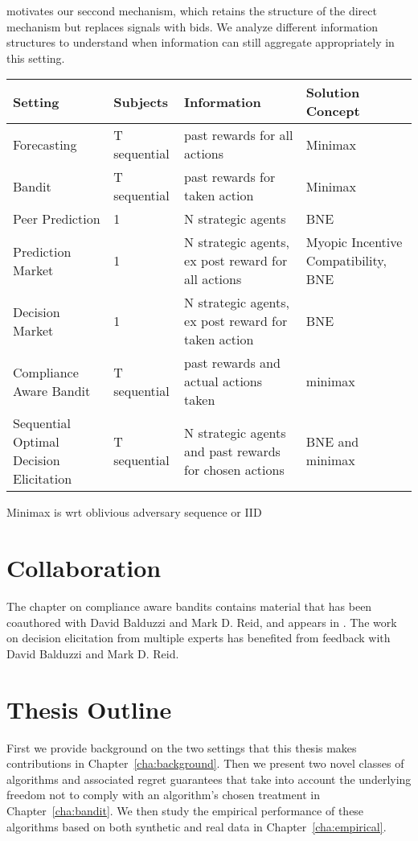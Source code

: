 motivates our seccond mechanism, which retains the structure of the direct mechanism but replaces signals with bids. We analyze different information structures to understand when information can still aggregate appropriately in this setting.

\begin{tabular}{llll}
\toprule
Setting & Subjects & Information & Solution Concept\\
\midrule
Forecasting & T sequential & past rewards for all actions & Minimax  \\
Bandit & T sequential & past rewards for taken action  &  Minimax  \\
Peer Prediction & 1 & N strategic agents & BNE \\
Prediction Market & 1 & N strategic agents, ex post reward for all actions & Myopic Incentive Compatibility, BNE\\
Decision Market & 1 & N strategic agents, ex post reward for taken action & BNE  \\
Compliance Aware Bandit & T sequential & past rewards and actual actions taken & minimax \\
Sequential Optimal Decision Elicitation  & T sequential &  N strategic agents and past rewards for chosen actions & BNE and minimax \\
\bottomrule
\end{tabular}

Minimax is wrt oblivious adversary sequence or IID




\section{Collaboration}

The chapter on compliance aware bandits contains material that has been coauthored with David Balduzzi and Mark D. Reid, and appears in \cite{della2016compliance}. The work on decision elicitation from multiple experts has benefited from feedback with David Balduzzi and Mark D. Reid.


\section{Thesis Outline}
\label{sec:outline}

First we provide background on the two settings that this thesis makes contributions in  Chapter~\ref{cha:background}. Then we present two novel classes of algorithms and associated regret guarantees that take into account the underlying freedom not to comply with an algorithm's chosen treatment in Chapter~\ref{cha:bandit}. We then study the empirical performance  of these algorithms based on both synthetic and real data in Chapter~\ref{cha:empirical}. 


